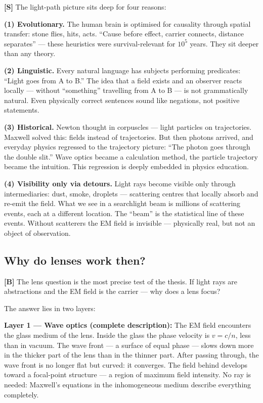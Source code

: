 \textbf{[S]} The light-path picture sits deep for four reasons:

\textbf{(1) Evolutionary.} The human brain is optimised for causality
through spatial transfer: stone flies, hits, acts. ``Cause before effect,
carrier connects, distance separates'' --- these heuristics were
survival-relevant for $10^5$ years. They sit deeper than any theory.

\textbf{(2) Linguistic.} Every natural language has subjects performing
predicates: ``Light goes from A to B.'' The idea that a field exists and
an observer reacts locally --- without ``something'' travelling from A
to B --- is not grammatically natural. Even physically correct sentences
sound like negations, not positive statements.

\textbf{(3) Historical.} Newton thought in corpuscles --- light particles
on trajectories. Maxwell solved this: fields instead of trajectories. But
then photons arrived, and everyday physics regressed to the trajectory
picture: ``The photon goes through the double slit.'' Wave optics became
a calculation method, the particle trajectory became the intuition. This
regression is deeply embedded in physics education.

\textbf{(4) Visibility only via detours.} Light rays become visible only
through intermediaries: dust, smoke, droplets --- scattering centres that
locally absorb and re-emit the field. What we see in a searchlight beam
is millions of scattering events, each at a different location. The
``beam'' is the statistical line of these events. Without scatterers the
EM field is invisible --- physically real, but not an object of observation.

\subsection{Why do lenses work then?}

\textbf{[B]} The lens question is the most precise test of the thesis.
If light rays are abstractions and the EM field is the carrier --- why
does a lens focus?

The answer lies in two layers:

\textbf{Layer 1 --- Wave optics (complete description):}
The EM field encounters the glass medium of the lens. Inside the glass
the phase velocity is $v = c/n$, less than in vacuum. The wave front ---
a surface of equal phase --- slows down more in the thicker part of the
lens than in the thinner part. After passing through, the wave front is
no longer flat but curved: it converges. The field behind develops toward
a focal-point structure --- a region of maximum field intensity. No ray
is needed: Maxwell's equations in the inhomogeneous medium describe
everything completely.

